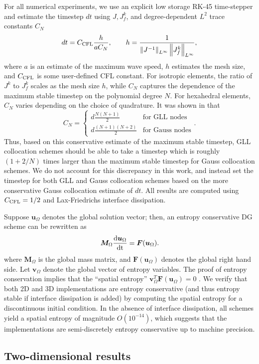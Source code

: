 \documentclass{svjour3}                     %
\newcommand{\td}[2]{\frac{{\rm d}#1}{{\rm d}{\rm #2}}}
\newcommand{\nor}[1]{\left\| #1 \right\|}
\newcommand{\LRp}[1]{\left( #1 \right)}
\begin{document}
For all numerical experiments, we use an explicit low storage RK-45 time-stepper \cite{carpenter1994fourth} and estimate the timestep $dt$ using $J, J^k_f$, and degree-dependent $L^2$ trace constants $C_N$ 
\[
dt = C_{\rm CFL}\frac{ h}{ a C_N}, \qquad h = \frac{1}{{\nor{J^{-1}}_{L^{\infty}}}\nor{J^k_f}_{L^{\infty}}},
\]
where $a$ is an estimate of the maximum wave speed, $h$ estimates the mesh size, and $C_{\rm CFL}$ is some user-defined CFL constant.  For isotropic elements, the ratio of $J^k$ to $J^k_f$ scales as the mesh size $h$, while $C_N$ captures the dependence of the maximum stable timestep on the polynomial degree $N$.  For hexahedral elements, $C_N$ varies depending on the choice of quadrature.  It was shown in \cite{chan2015gpu} that 
\[
C_N =\begin{cases}
 d\frac{N(N+1)}{2} & \text{for GLL nodes}\\
d\frac{(N+1)(N+2)}{2} & \text{for Gauss nodes}
\end{cases}.
\]
Thus, based on this conservative estimate of the maximum stable timestep, GLL collocation schemes should be able to take a timestep which is roughly $(1 + 2/N)$ times larger than the maximum stable timestep for Gauss collocation schemes.  We do not account for this discrepancy in this work, and instead set the timestep for both GLL and Gauss collocation schemes based on the more conservative Gauss collocation estimate of $dt$.  All results are computed using $C_{\rm CFL} = 1/2$ and Lax-Friedrichs interface dissipation.  

Suppose $\bm{u}_{\Omega}$ denotes the global solution vector; then, an entropy conservative DG scheme can be rewritten as
\[
\bm{M}_{\Omega}\td{\bm{u}_{\Omega}}{t} = \bm{F}(\bm{u}_{\Omega}).
\]
where $\bm{M}_{\Omega}$ is the global mass matrix, and $\bm{F}(\bm{u}_{\Omega})$ denotes the global right hand side.  Let $\bm{v}_{\Omega}$ denote the global vector of entropy variables.  The proof of entropy conservation implies that the ``spatial entropy'' $\bm{v}_{\Omega}^T\bm{F}(\bm{u}_{\Omega}) = 0$ \cite{crean2018entropy}.   We verify that both 2D and 3D implementations are entropy conservative (and thus entropy stable if interface dissipation is added) by computing the spatial entropy for a discontinuous initial condition.  In the absence of interface dissipation, all schemes yield a spatial entropy of magnitude $O\LRp{10^{-14}}$, which suggests that the implementations are semi-discretely entropy conservative up to machine precision.


\subsection{Two-dimensional results}
\end{document}

